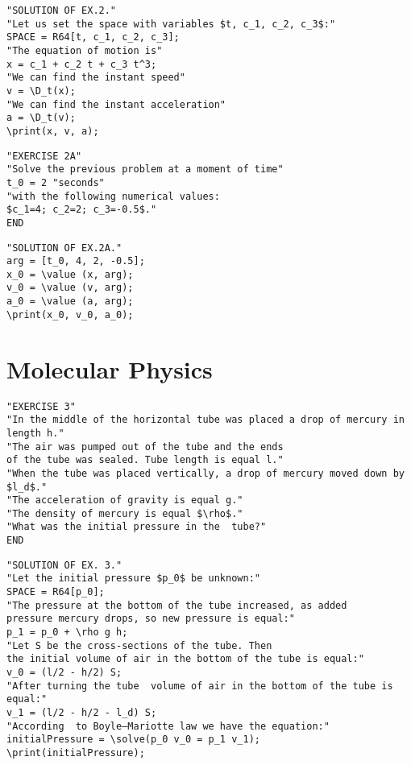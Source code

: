 \begin{verbatim}
"SOLUTION OF EX.2."
"Let us set the space with variables $t, c_1, c_2, c_3$:"
SPACE = R64[t, c_1, c_2, c_3];
"The equation of motion is"
x = c_1 + c_2 t + c_3 t^3;
"We can find the instant speed"
v = \D_t(x);
"We can find the instant acceleration"
a = \D_t(v);
\print(x, v, a);
\end{verbatim}

\vspace*{-3mm}

\begin{verbatim}
"EXERCISE 2A"
"Solve the previous problem at a moment of time"
t_0 = 2 "seconds"
"with the following numerical values:
$c_1=4; c_2=2; c_3=-0.5$."
END
\end{verbatim}

\vspace*{-3mm}

\begin{verbatim}
"SOLUTION OF EX.2A."
arg = [t_0, 4, 2, -0.5];
x_0 = \value (x, arg);  
v_0 = \value (v, arg);
a_0 = \value (a, arg);
\print(x_0, v_0, a_0);
\end{verbatim}

\vspace*{-3mm}

\section{Molecular Physics} 

\begin{verbatim}
"EXERCISE 3"
"In the middle of the horizontal tube was placed a drop of mercury in length h." 
"The air was pumped out of the tube and the ends 
of the tube was sealed. Tube length is equal l." 
"When the tube was placed vertically, a drop of mercury moved down by $l_d$."
"The acceleration of gravity is equal g."
"The density of mercury is equal $\rho$."
"What was the initial pressure in the  tube?"
END
\end{verbatim}

\vspace*{-3mm}

\begin{verbatim}
"SOLUTION OF EX. 3."
"Let the initial pressure $p_0$ be unknown:"
SPACE = R64[p_0];
"The pressure at the bottom of the tube increased, as added
pressure mercury drops, so new pressure is equal:"
p_1 = p_0 + \rho g h;
"Let S be the cross-sections of the tube. Then
the initial volume of air in the bottom of the tube is equal:"
v_0 = (l/2 - h/2) S;
"After turning the tube  volume of air in the bottom of the tube is equal:"
v_1 = (l/2 - h/2 - l_d) S;
"According  to Boyle–Mariotte law we have the equation:"
initialPressure = \solve(p_0 v_0 = p_1 v_1);
\print(initialPressure);
\end{verbatim}


